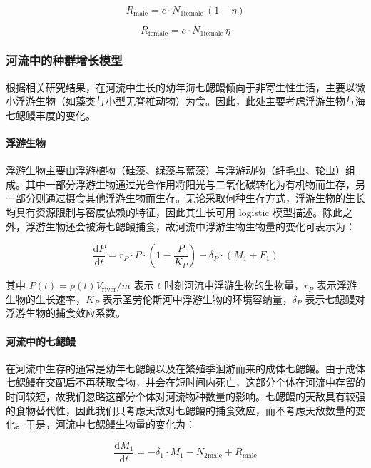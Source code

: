 \documentclass[11pt,a4paper]{ctexart}
\begin{document}
\begin{equation}
R_{\mathrm{male}}=c\cdot N_{1\mathrm{female}}\,(1-\eta)
\end{equation}

\begin{equation}
R_{\mathrm{female}}=c\cdot N_{1\mathrm{female}}\,\eta
\end{equation}

\subsubsection{河流中的种群增长模型}

根据相关研究结果\cite{3}，在河流中生长的幼年海七鳃鳗倾向于非寄生性生活，主要以微小浮游生物（如藻类与小型无脊椎动物）为食。因此，此处主要考虑浮游生物与海七鳃鳗丰度的变化。

\paragraph{浮游生物}

浮游生物主要由浮游植物（硅藻、绿藻与蓝藻）与浮游动物（纤毛虫、轮虫）组成。其中一部分浮游生物通过光合作用将阳光与二氧化碳转化为有机物而生存，另一部分则通过摄食其他浮游生物而生存。无论采取何种生存方式，浮游生物的生长均具有资源限制与密度依赖的特征，因此其生长可用 logistic 模型描述。除此之外，浮游生物还会被海七鳃鳗捕食，故河流中浮游生物生物量的变化可表示为：

\begin{equation}
\frac{\mathrm{d}P}{\mathrm{d}t}=r_P\cdot P\cdot\left(1-\frac{P}{K_P}\right)-\delta_P\cdot(M_1+F_1)
\end{equation}

其中 $P(t)=\rho(t)V_{\mathrm{river}}/m$ 表示 $t$ 时刻河流中浮游生物的生物量，$r_P$ 表示浮游生物的生长速率，$K_P$ 表示圣劳伦斯河中浮游生物的环境容纳量，$\delta_P$ 表示七鳃鳗对浮游生物的捕食效应系数。

\paragraph{河流中的七鳃鳗}

在河流中生存的通常是幼年七鳃鳗以及在繁殖季洄游而来的成体七鳃鳗。由于成体七鳃鳗在交配后不再获取食物，并会在短时间内死亡，这部分个体在河流中存留的时间较短，故我们忽略这部分个体对河流物种数量的影响。七鳃鳗的天敌具有较强的食物替代性，因此我们只考虑天敌对七鳃鳗的捕食效应，而不考虑天敌数量的变化。于是，河流中七鳃鳗生物量的变化为：

\begin{equation}
\frac{\mathrm{d}M_1}{\mathrm{d}t}=-\delta_1\cdot M_1-N_{2\mathrm{male}}+R_{\mathrm{male}}
\end{equation}
\end{document}
